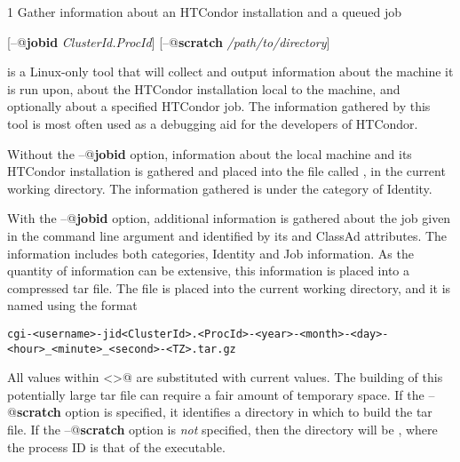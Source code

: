 \begin{ManPage}{\label{man-condor-gather-info}}{1}
{Gather information about an HTCondor installation and a queued job}
\Synopsis

[\verb@--@\textbf{jobid} \textit{ClusterId.ProcId}]
[\verb@--@\textbf{scratch} \textit{/path/to/directory}]


\Description

 is a Linux-only tool that
will collect and output information 
about the machine it is run upon,
about the HTCondor installation local to the machine, 
and optionally about a specified HTCondor job. 
The information gathered by this tool is most often used as a debugging aid
for the developers of HTCondor.

Without the \verb@--@\textbf{jobid} option, information about the
local machine and its HTCondor installation is gathered and
placed into the file called ,
in the current working directory. 
The information gathered is under the category of Identity.

With the \verb@--@\textbf{jobid} option, 
additional information is gathered about the job given
in the command line argument and identified by
its  and  ClassAd attributes.
The information includes both categories, 
Identity and Job information.
As the quantity of information can be extensive,
this information is placed into a compressed tar file.
The file is placed into the current working directory,
and it is named using the format
\footnotesize
\begin{verbatim}
cgi-<username>-jid<ClusterId>.<ProcId>-<year>-<month>-<day>-<hour>_<minute>_<second>-<TZ>.tar.gz
\end{verbatim}
\normalsize
All values within \verb@<>@ are substituted with current values.
The building of this potentially large tar file can require a fair
amount of temporary space.
If the \verb@--@\textbf{scratch} option is specified,
it identifies a directory in which to build the tar file.
If the \verb@--@\textbf{scratch} option is \emph{not} specified, 
then the directory will be ,
where the process ID is that of the  executable.


\end{ManPage}
